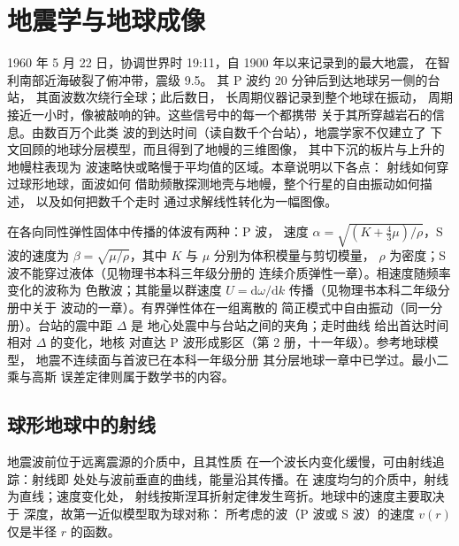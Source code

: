 \chapter{地震学与地球成像}\label{ch:b3:seismology-imaging}

1960 年 5 月 22 日，协调世界时 19:11，自 1900 年以来记录到的最大地震，
在智利南部近海破裂了俯冲带，震级 9.5。
其 P 波约 20 分钟后到达地球另一侧的台站，
其面波数次绕行全球；此后数日，
长周期仪器记录到整个地球在振动，
周期接近一小时，像被敲响的钟。这些信号中的每一个都携带
关于其所穿越岩石的信息。由数百万个此类
波的到达时间（读自数千个台站），地震学家不仅建立了
下文回顾的地球分层模型，而且得到了地幔的三维图像，
其中下沉的板片与上升的地幔柱表现为
波速略快或略慢于平均值的区域。本章说明以下各点：
射线如何穿过球形地球，面波如何
借助频散探测地壳与地幔，整个行星的自由振动如何描述，
以及如何把数千个走时
通过求解线性转化为一幅图像。

\begin{recall}
在各向同性弹性固体中传播的体波有两种：P 波，
速度 $\alpha = \sqrt{(K + \tfrac43\mu)/\rho}$，S 波的速度为
$\beta = \sqrt{\mu/\rho}$，其中 $K$ 与 $\mu$ 分别为体积模量与剪切模量，
$\rho$ 为密度；S 波不能穿过液体（见物理书本科三年级分册的
连续介质弹性一章）。相速度随频率变化的波称为
色散波；其能量以群速度
$U = \mathrm d\omega/\mathrm dk$ 传播（见物理书本科二年级分册中关于
波动的一章）。有界弹性体在一组离散的
简正模式中自由振动（同一分册）。台站的震中距 $\Delta$ 是
地心处震中与台站之间的夹角；走时曲线
给出首达时间相对 $\Delta$ 的变化，地核
对直达 P 波形成影区（第 2 册，十一年级）。参考地球模型，
地震不连续面与首波已在本科一年级分册
其分层地球一章中已学过。最小二乘与高斯
误差定律则属于数学书的内容。
\end{recall}

\section{球形地球中的射线}

地震波前位于远离震源的介质中，且其性质
在一个波长内变化缓慢，可由射线追踪：射线即
处处与波前垂直的曲线，能量沿其传播。在
速度均匀的介质中，射线为直线；速度变化处，
射线按斯涅耳折射定律发生弯折。地球中的速度主要取决于
深度，故第一近似模型取为球对称：
所考虑的波（P 波或 S 波）的速度 $v(r)$ 仅是半径 $r$ 的函数。

